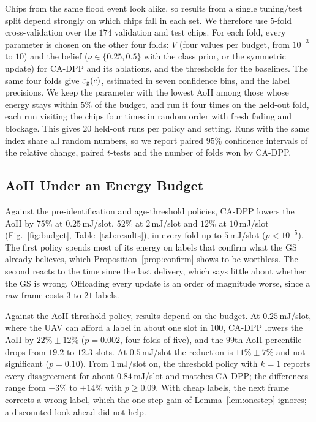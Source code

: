 Chips from the same flood event look alike, so results from a single tuning/test split depend strongly on which chips fall in each set. We therefore use $5$-fold cross-validation over the $174$ validation and test chips. For each fold, every parameter is chosen on the other four folds: $V$ (four values per budget, from $10^{-3}$ to $10$) and the belief ($\nu\in\{0.25,0.5\}$ with the class prior, or the symmetric update) for CA-DPP and its ablations, and the thresholds for the baselines. The same four folds give $\varepsilon_{\rm g}(c)$, estimated in seven confidence bins, and the label precisions. We keep the parameter with the lowest AoII among those whose energy stays within $5\%$ of the budget, and run it four times on the held-out fold, each run visiting the chips four times in random order with fresh fading and blockage. This gives $20$ held-out runs per policy and setting. Runs with the same index share all random numbers, so we report paired $95\%$ confidence intervals of the relative change, paired $t$-tests and the number of folds won by CA-DPP.

\subsection{AoII Under an Energy Budget}
Against the pre-identification and age-threshold policies, CA-DPP lowers the AoII by $75\%$ at $0.25$\,mJ/slot, $52\%$ at $2$\,mJ/slot and $12\%$ at $10$\,mJ/slot (Fig.~\ref{fig:budget}, Table~\ref{tab:results}), in every fold up to $5$\,mJ/slot ($p<10^{-5}$). The first policy spends most of its energy on labels that confirm what the GS already believes, which Proposition~\ref{prop:confirm} shows to be worthless. The second reacts to the time since the last delivery, which says little about whether the GS is wrong. Offloading every update is an order of magnitude worse, since a raw frame costs $3$ to $21$ labels.

Against the AoII-threshold policy, results depend on the budget. At $0.25$\,mJ/slot, where the UAV can afford a label in about one slot in $100$, CA-DPP lowers the AoII by $22\%\pm12\%$ ($p=0.002$, four folds of five), and the $99$th AoII percentile drops from $19.2$ to $12.3$ slots. At $0.5$\,mJ/slot the reduction is $11\%\pm7\%$ and not significant ($p=0.10$). From $1$\,mJ/slot on, the threshold policy with $k=1$ reports every disagreement for about $0.84$\,mJ/slot and matches CA-DPP; the differences range from $-3\%$ to $+14\%$ with $p\ge0.09$. With cheap labels, the next frame corrects a wrong label, which the one-step gain of Lemma~\ref{lem:onestep} ignores; a discounted look-ahead did not help.

